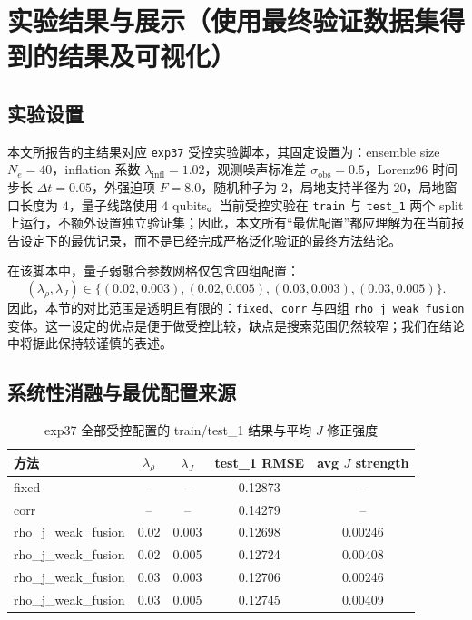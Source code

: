 \section{实验结果与展示（使用最终验证数据集得到的结果及可视化）}
\subsection{实验设置}
本文所报告的主结果对应 \texttt{exp37} 受控实验脚本，其固定设置为：ensemble size $N_e=40$，inflation 系数 $\lambda_{\mathrm{infl}}=1.02$，观测噪声标准差 $\sigma_{\mathrm{obs}}=0.5$，Lorenz96 时间步长 $\Delta t=0.05$，外强迫项 $F=8.0$，随机种子为 $2$，局地支持半径为 $20$，局地窗口长度为 $4$，量子线路使用 $4$ qubits。当前受控实验在 \texttt{train} 与 \texttt{test\_1} 两个 split 上运行，不额外设置独立验证集；因此，本文所有“最优配置”都应理解为在当前报告设定下的最优记录，而不是已经完成严格泛化验证的最终方法结论。

在该脚本中，量子弱融合参数网格仅包含四组配置：
\begin{equation}
(\lambda_\rho,\lambda_J)\in\{(0.02,0.003),(0.02,0.005),(0.03,0.003),(0.03,0.005)\}.
\end{equation}
因此，本节的对比范围是透明且有限的：\texttt{fixed}、\texttt{corr} 与四组 \texttt{rho\_j\_weak\_fusion} 变体。这一设定的优点是便于做受控比较，缺点是搜索范围仍然较窄；我们在结论中将据此保持较谨慎的表述。

\subsection{系统性消融与最优配置来源}

\begin{table}[htbp]
\centering
\caption{exp37 全部受控配置的 train/test\_1 结果与平均 $J$ 修正强度}
\label{tab:ablation}
\begin{tabular}{lcccc}
\toprule
方法 & $\lambda_\rho$ & $\lambda_J$ & test\_1 RMSE & avg $J$ strength \\
\midrule
fixed & -- & -- & 0.12873 & -- \\
corr & -- & -- & 0.14279 & -- \\
rho\_j\_weak\_fusion & 0.02 & 0.003 & 0.12698 & 0.00246 \\
rho\_j\_weak\_fusion & 0.02 & 0.005 & 0.12724 & 0.00408 \\
rho\_j\_weak\_fusion & 0.03 & 0.003 & 0.12706 & 0.00246 \\
rho\_j\_weak\_fusion & 0.03 & 0.005 & 0.12745 & 0.00409 \\
\bottomrule
\end{tabular}
\end{table}

